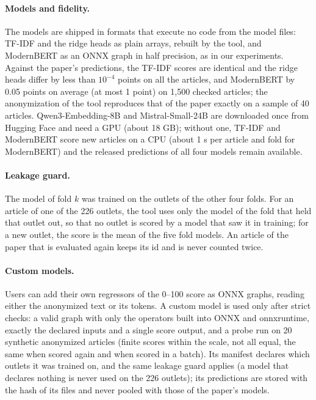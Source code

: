 \documentclass[11pt,a4paper]{article}
\begin{document}
\paragraph{Models and fidelity.}
The models are shipped in formats that execute no code from the model files: TF-IDF and the ridge heads as plain
arrays, rebuilt by the tool, and ModernBERT as an ONNX graph in half precision, as in our experiments. Against the
paper's predictions, the TF-IDF scores are identical and the ridge heads differ by less than $10^{-4}$ points on all
the articles, and ModernBERT by 0.05 points on average (at most 1 point) on 1,500 checked articles; the anonymization
of the tool reproduces that of the paper exactly on a sample of 40 articles. Qwen3-Embedding-8B and Mistral-Small-24B
are downloaded once from Hugging Face and need a GPU (about 18 GB); without one, TF-IDF and ModernBERT score new
articles on a CPU (about 1 s per article and fold for ModernBERT) and the released predictions of all four models
remain available.

\paragraph{Leakage guard.}
The model of fold $k$ was trained on the outlets of the other four folds. For an article of one of the 226 outlets, the
tool uses only the model of the fold that held that outlet out, so that no outlet is scored by a model that saw it in
training; for a new outlet, the score is the mean of the five fold models. An article of the paper that is evaluated
again keeps its id and is never counted twice.

\paragraph{Custom models.}
Users can add their own regressors of the 0--100 score as ONNX graphs, reading either the anonymized text or its
tokens. A custom model is used only after strict checks: a valid graph with only the operators built into ONNX and
onnxruntime, exactly the declared inputs and a single score output, and a probe run on 20 synthetic anonymized articles
(finite scores within the scale, not all equal, the same when scored again and when scored in a batch). Its manifest
declares which outlets it was trained on, and the same leakage guard applies (a model that declares nothing is never
used on the 226 outlets); its predictions are stored with the hash of its files and never pooled with those of the
paper's models.
\end{document}
